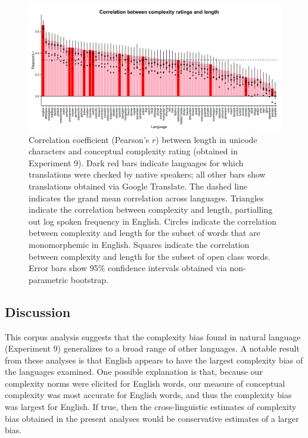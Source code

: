 \documentclass[man]{apa2}
\begin{document}
 \begin{figure}
 \begin{center}
  \includegraphics[width=6.3in]{figures/xling_plot.png}
  \caption{\label{fig:study4a_plasd} Correlation coefficient (Pearson's $r$) between length in unicode characters and conceptual complexity rating (obtained in Experiment 9). Dark red bars indicate languages for which translations were checked by native speakers; all other bars show translations obtained via Google Translate. The dashed line indicates the grand mean correlation across languages. Triangles indicate the correlation between complexity and length, partialling out log spoken frequency in English. Circles indicate the correlation between complexity and length for the subset of words that are monomorphemic in English. Squares indicate the correlation between complexity and length for the subset of open class words. Error bars show 95\% confidence intervals obtained via non-parametric bootstrap. }
 \end{center}
\end{figure}


\subsection{Discussion}

This corpus analysis suggests that the complexity bias found in natural language (Experiment 9) generalizes to a broad range of other languages. A notable result from these analyses is that English appears to have the largest complexity bias of the languages examined. One possible explanation is that, because our complexity norms were elicited for English words, our measure of conceptual complexity was most accurate for English words, and thus the complexity bias was largest for English. If true, then the cross-linguistic estimates of complexity bias obtained in the present analyses would be conservative estimates of a larger bias.
\end{document}
